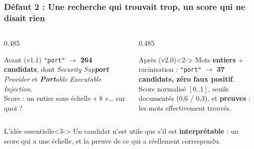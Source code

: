 \documentclass[aspectratio=169,11pt]{beamer}
\begin{document}
\begin{frame}
  \frametitle{Défaut 2 : Une recherche qui trouvait trop, un score qui ne disait rien}
  \vspace{0.1cm}
  \begin{columns}[T]
    \begin{column}{0.485\textwidth}
      \begin{alertblock}{Avant (v1.1)}
        \footnotesize \texttt{"port"} $\rightarrow$ \textbf{264 candidats},
        dont \emph{Security Sup\textbf{port} Provider} et
        \emph{\textbf{Port}able Executable Injection}.\\[3pt]
        Score : un entier sans échelle « 8 »\ldots{} sur quoi ?
      \end{alertblock}
    \end{column}
    \begin{column}{0.485\textwidth}
      \begin{exampleblock}{Après (v2.0)}<2->
        \footnotesize Mots \textbf{entiers} + racinisation :
        \texttt{"port"} $\rightarrow$ \textbf{37 candidats, zéro faux
        positif}.\\[3pt]
        Score normalisé $[0..1]$, seuils documentés (0,6 / 0,3), et
        \textbf{preuves} : les mots effectivement trouvés.
      \end{exampleblock}
    \end{column}
  \end{columns}
  \vspace{0.35cm}
  \begin{block}{L'idée essentielle}<3->
    Un candidat n'est utile que s'il est \textbf{interprétable} : un score qui
    a une échelle, et la preuve de ce qui a réellement correspondu.
  \end{block}
\end{frame}
 
\end{document}

